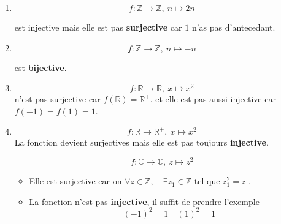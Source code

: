 \documentclass{report}
\begin{document}
\begin{myproof}
 \begin{enumerate}
   \item 
$$ f : \mathbb{Z}\rightarrow\mathbb{Z}, \ n\mapsto 2n$$

est injective mais elle est pas \textbf{surjective} car $1$ n'as pas
d'antecedant.\\

\item 
  $$
f :
\mathbb{Z}\rightarrow\mathbb{Z} ,\ n\mapsto -n
  $$

  est \textbf{bijective}.
\item 

  $$
f :
\mathbb{R}\rightarrow\mathbb{R} ,\ x\mapsto x^2
  $$
  n'est pas surjective car $f(\mathbb{R}) = \mathbb{R}^+$. et elle est pas aussi
  injective car $f(-1) = f(1) = 1$.

\item 

  $$
f :
\mathbb{R}\rightarrow\mathbb{R^+} ,\ x\mapsto x^2
  $$
  La fonction devient surjectives mais elle est pas toujours \textbf{injective}.

  $$
f :
\mathbb{C}\rightarrow\mathbb{C} ,\ z\mapsto z^2
  $$
\begin{itemize}
  \item Elle est surjective car on $\forall z \in \mathbb{Z}, \quad \exists z_1
  \in \mathbb{Z} \text{ tel que } z_1^2 = z$
  .
\item La fonction n'est pas \textbf{injective}, il suffit de prendre l'exemple 
  $$
  (-1)^2 = 1 \quad (1)^2 = 1
  $$
  
\end{itemize}
 \end{enumerate} 
\end{myproof}



\end{document}

